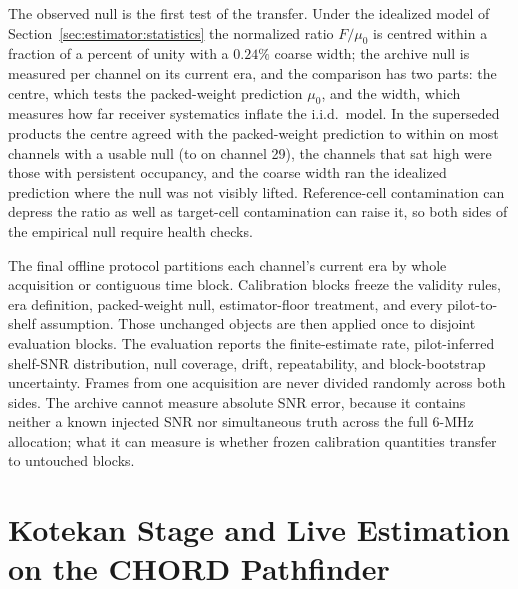 The observed null is the first test of the transfer. Under the idealized model of Section~\ref{sec:estimator:statistics} the normalized ratio $F/\mu_0$ is centred within a fraction of a percent of unity with a $0.24\%$ coarse width; the archive null is measured per channel on its current era, and the comparison has two parts: the centre, which tests the packed-weight prediction $\mu_0$, and the width, which measures how far receiver systematics inflate the i.i.d.\ model. In the superseded products the centre agreed with the packed-weight prediction to within  on most channels with a usable null (to  on channel 29), the channels that sat  high were those with persistent occupancy, and the coarse width ran  the idealized prediction where the null was not visibly lifted. Reference-cell contamination can depress the ratio as well as target-cell contamination can raise it, so both sides of the empirical null require health checks.

The final offline protocol partitions each channel's current era by whole acquisition or contiguous time block. Calibration blocks freeze the validity rules, era definition, packed-weight null, estimator-floor treatment, and every pilot-to-shelf assumption. Those unchanged objects are then applied once to disjoint evaluation blocks. The evaluation reports the finite-estimate rate, pilot-inferred shelf-SNR distribution, null coverage, drift, repeatability, and block-bootstrap uncertainty. Frames from one acquisition are never divided randomly across both sides. The archive cannot measure absolute SNR error, because it contains neither a known injected SNR nor simultaneous truth across the full 6-MHz allocation; what it can measure is whether frozen calibration quantities transfer to untouched blocks.

\section{Kotekan Stage and Live Estimation on the CHORD Pathfinder}
\label{sec:estimator:runtime}

